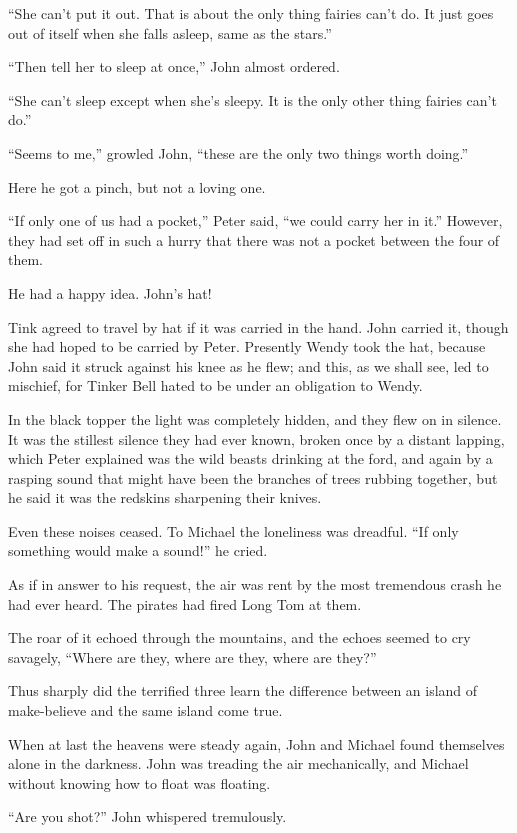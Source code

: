 “She can’t put it out.
That is about the only thing fairies can’t do.
It just goes out of itself when she falls asleep, same as the stars.”

“Then tell her to sleep at once,” John almost ordered.

“She can’t sleep except when she’s sleepy.
It is the only other thing fairies can’t do.”

“Seems to me,” growled John, “these are the only two things worth doing.”

Here he got a pinch, but not a loving one.

“If only one of us had a pocket,” Peter said, “we could carry her in it.”
However, they had set off in such a hurry that there was not a pocket between the four of them.

He had a happy idea.
John’s hat!

Tink agreed to travel by hat if it was carried in the hand.
John carried it, though she had hoped to be carried by Peter.
Presently Wendy took the hat, because John said it struck against his knee as he flew;
and this, as we shall see, led to mischief,
for Tinker Bell hated to be under an obligation to Wendy.

In the black topper the light was completely hidden, and they flew on in silence.
It was the stillest silence they had ever known, broken once by a distant lapping,
which Peter explained was the wild beasts drinking at the ford,
and again by a rasping sound that might have been the branches of trees rubbing together,
but he said it was the redskins sharpening their knives.

Even these noises ceased.
To Michael the loneliness was dreadful.
“If only something would make a sound!\@” he cried.

As if in answer to his request, the air was rent by the most tremendous crash he had ever heard.
The pirates had fired Long Tom at them.

The roar of it echoed through the mountains,
and the echoes seemed to cry savagely, “Where are they, where are they, where are they?”

Thus sharply did the terrified three learn the difference
between an island of make-believe and the same island come true.

When at last the heavens were steady again,
John and Michael found themselves alone in the darkness.
John was treading the air mechanically, and Michael without knowing how to float was floating.

“Are you shot?\@” John whispered tremulously.

